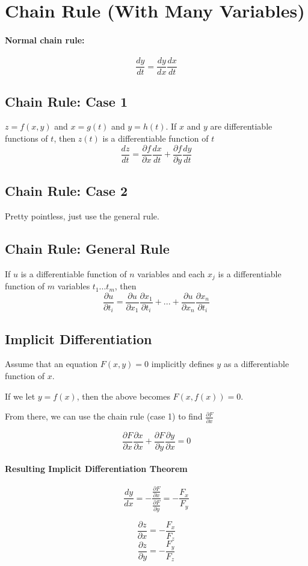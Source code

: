 \documentclass[a4paper,12pt]{report}
\begin{document}
\section{Chain Rule (With Many Variables)}
\paragraph{Normal chain rule: }
$$\frac{dy}{dt} = \frac{dy}{dx} \frac{dx}{dt}$$

\subsection{Chain Rule: Case 1}
$z = f(x, y)$ and $x = g(t)$ and $y = h(t)$. If $x$ and $y$ are differentiable functions of $t$, then $z(t)$ is a differentiable function of $t$
$$\frac{dz}{dt} = \frac{\partial f}{\partial x} \frac{dx}{dt} + \frac{\partial f}{\partial y} \frac{dy}{dt}$$

\subsection{Chain Rule: Case 2}
Pretty pointless, just use the general rule.

\subsection{Chain Rule: General Rule} 
If $u$ is a differentiable function of $n$ variables and each $x_j$ is a differentiable function of $m$ variables $t_1 ... t_m$, then
$$\frac{\partial u}{\partial t_i} = \frac{\partial u}{\partial x_1}\frac{\partial x_1}{\partial t_i} + ... + \frac{\partial u}{\partial x_n} \frac{\partial x_n}{\partial t_i}$$

\subsection{Implicit Differentiation}
Assume that an equation $F(x, y) = 0$ implicitly defines $y$ as a differentiable function of $x$.

If we let $y = f(x)$, then the above becomes $F(x, f(x)) = 0$.

From there, we can use the chain rule (case 1) to find $\frac{\partial F}{\partial x}$

$$\frac{\partial F}{\partial x} \frac{\partial x}{\partial x} + \frac{\partial F}{\partial y} \frac{\partial y}{\partial x} = 0$$

\paragraph{Resulting Implicit Differentiation Theorem}
$$\frac{dy}{dx} = - \frac{ \frac{\partial F}{\partial x} }{ \frac{\partial F}{\partial y} } = - \frac{F_x}{F_y}$$

$$\frac{\partial z}{\partial x} = - \frac{F_x}{F_z}$$
$$\frac{\partial z}{\partial y} = - \frac{F_y}{F_z}$$
\end{document}
